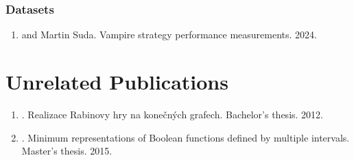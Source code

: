
\subsubsection{Datasets}

\begin{enumerate}
\item {} and Martin Suda. Vampire strategy performance measurements. 2024. \cite{bartek10814478}
\end{enumerate}

\section{Unrelated Publications}

\begin{enumerate}
\item {}. \foreignlanguage{czech}{Realizace Rabinovy hry na konečných grafech}. Bachelor's thesis. 2012. \cite{Bartek2012thesis}
\item {}. Minimum representations of Boolean functions defined by multiple intervals. Master's thesis. 2015. \cite{bartek2015}
\end{enumerate}
